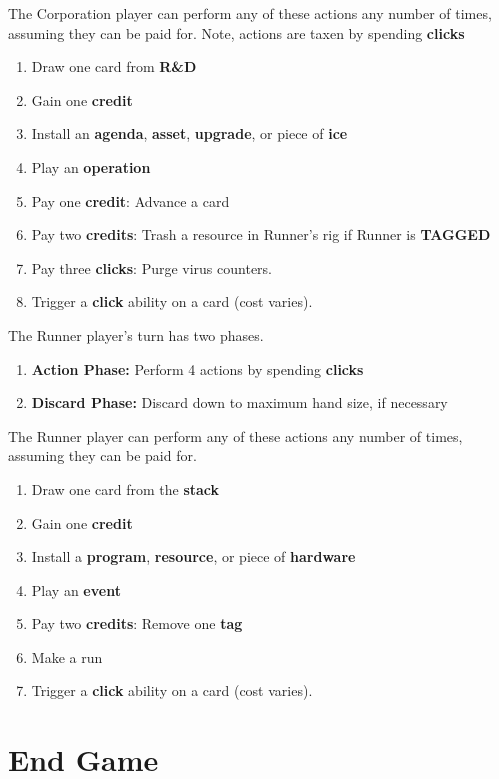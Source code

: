 \documentclass[12pt]{article}
\newenvironment{enumerateCustom}
{\begin{enumerate}
  \setlength{\itemsep}{1pt}
  \setlength{\parskip}{0pt}
  \setlength{\parsep}{0pt}}
{\end{enumerate}}
\begin{document}
\begin{mdframed}[style = customFrame]
\begin{multicols*}{2}
The Corporation player can perform any of these actions any number of times, assuming they can be paid for. Note, actions are taxen by spending \textbf{clicks}
\begin{enumerateCustom}
	\item Draw one card from \textbf{R\&D}
	\item Gain one \textbf{credit}
	\item Install an \textbf{agenda}, \textbf{asset}, \textbf{upgrade}, or piece of \textbf{ice}
	\item Play an \textbf{operation}
	\item Pay one \textbf{credit}: Advance a card
	\item Pay two \textbf{credits}: Trash a resource in Runner's rig if Runner is \textbf{TAGGED}
	\item Pay three \textbf{clicks}: Purge virus counters.
	\item Trigger a \textbf{click} ability on a card (cost varies).
\end{enumerateCustom}

The Runner player's turn has two phases.
\begin{enumerateCustom}
	\item \textbf{Action Phase:} Perform 4 actions by spending \textbf{clicks}
	\item \textbf{Discard Phase:} Discard down to maximum hand size, if necessary
\end{enumerateCustom}

The Runner player can perform any of these actions any number of times, assuming they can be paid for.
\begin{enumerateCustom}
	\item Draw one card from the \textbf{stack}
	\item Gain one \textbf{credit}
	\item Install a \textbf{program}, \textbf{resource}, or piece of \textbf{hardware}
	\item Play an \textbf{event}
	\item Pay two \textbf{credits}: Remove one \textbf{tag}
	\item Make a run
	\item Trigger a \textbf{click} ability on a card (cost varies).
\end{enumerateCustom}
\section*{End Game}

\end{multicols*}
\end{mdframed}
\end{document}
